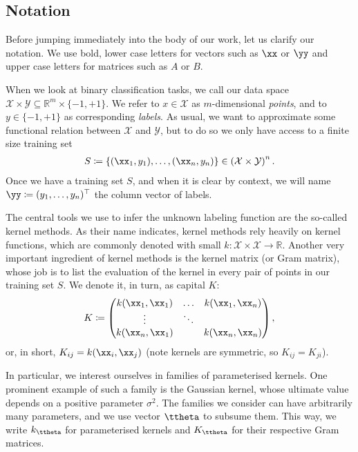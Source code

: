 \documentclass[twocolumn,superscriptaddress,nofootinbib]{revtex4-2}
\newcommand{\X}{\mathcal{X}}
\newcommand{\Y}{\mathcal{Y}}
\newcommand{\R}{\mathbb{R}}
\begin{document}
\subsection*{Notation}
    Before jumping immediately into the body of our work, let us clarify our notation.
    We use bold, lower case letters for vectors such as $\xx$ or $\yy$ and upper case letters for matrices such as $A$ or $B$.
    
    When we look at binary classification tasks, we call our data space $\X\times\Y\subseteq\R^m\times\{-1,+1\}$.
    We refer to $x\in\X$ as $m$-dimensional \emph{points}, and to $y\in\{-1,+1\}$ as corresponding \emph{labels}.
    As usual, we want to approximate some functional relation between $\X$ and $\Y$, but to do so we only have access to a finite size training set
    \begin{align}
        S\coloneqq\{(\xx_1,y_1),\ldots,(\xx_n,y_n)\}\in\left(\X\times\Y\right)^n.
    \end{align}
    Once we have a training set $S$, and when it is clear by context, we will name $\yy\coloneqq(y_1,\ldots,y_n)^\top$ the column vector of labels.
    
    The central tools we use to infer the unknown labeling function are the so-called kernel methods.
    As their name indicates, kernel methods rely heavily on kernel functions, which are commonly denoted with small $k\colon\X\times\X\to\R$.
    Another very important ingredient of kernel methods is the kernel matrix (or Gram matrix), whose job is to list the evaluation of the kernel in every pair of points in our training set $S$.
    We denote it, in turn, as capital $K$:
    \begin{equation}
        K \coloneqq \begin{pmatrix}
            k(\xx_1,\xx_1) & \ldots & k(\xx_1,\xx_n) \\
            \vdots & \ddots & \\
            k(\xx_n,\xx_1) & & k(\xx_n,\xx_n)
        \end{pmatrix},
    \end{equation}
    or, in short, $K_{ij} = k(\xx_i,\xx_j)$ (note kernels are symmetric, so $K_{ij} = K_{ji}$).
    
    In particular, we interest ourselves in families of parameterised kernels.
    One prominent example of such a family is the Gaussian kernel, whose ultimate value depends on a positive parameter $\sigma^2$.
    The families we consider can have arbitrarily many parameters, and we use vector $\ttheta$ to subsume them.
    This way, we write $k_{\ttheta}$ for parameterised kernels and $K_{\ttheta}$ for their respective Gram matrices.
\end{document}
